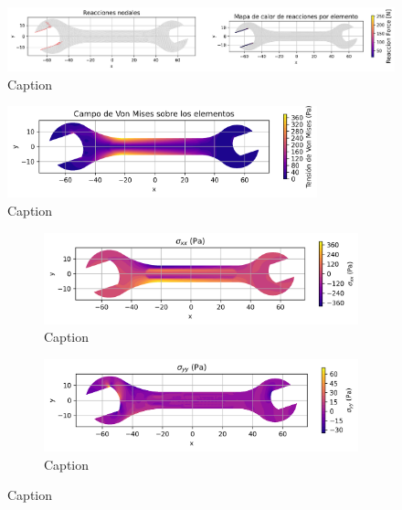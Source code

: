 \begin{figure}[H]
  \centering
  \includegraphics[width=1\textwidth]{GRAFICOS/Case b_deformada_reacciones.png}
  \caption{Caption}
  \label{fig:principal}
\end{figure}

\begin{figure}[H]
  \centering
  \includegraphics[width=0.8\textwidth]{GRAFICOS/Case b_von_mises.png}
  \caption{Caption}
  \label{fig:principal}
\end{figure}

\begin{figure}[H]
  \centering
  \begin{subfigure}[t]{0.49\textwidth}
    \centering
    \includegraphics[width=\textwidth]{GRAFICOS/Case b - sigma_xx.png}
    \caption{Caption}
    \label{fig:deformada_reacciones}
  \end{subfigure}
  \hfill
  \begin{subfigure}[t]{0.49\textwidth}
    \centering
    \includegraphics[width=\textwidth]{GRAFICOS/Case b - sigma_yy.png}
    \caption{Caption}
    \label{fig:von_mises}
  \end{subfigure}
  \caption{Caption}
  \label{fig:analisis_estructural}
\end{figure}

